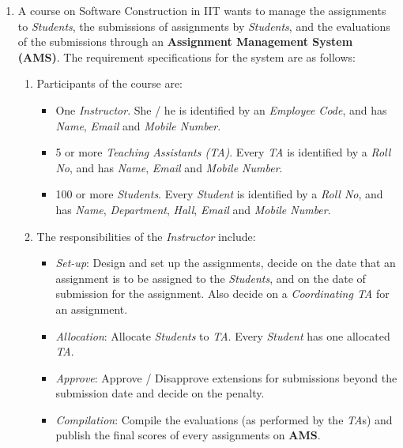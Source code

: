 \documentclass{article}
\begin{document}
\begin{tabular}{l}
\hspace{16cm} \\ \hline 
\end{tabular}
\begin{enumerate}


\item A course on \textsf{Software Construction} in IIT wants to manage the assignments to {\em Students}, the submissions of assignments by {\em Students}, and the evaluations of the submissions through an {\bf Assignment Management System (AMS)}. The requirement specifications for the system are as follows:

\begin{enumerate}
\item Participants of the course are: 

\begin{itemize}

\item One {\em Instructor}. She / he is identified by an {\em Employee Code}, and has {\em Name}, {\em Email} and {\em Mobile Number}.
\item 5 or more {\em Teaching Assistants (TA)}. Every {\em TA} is identified by a {\em Roll No}, and has {\em Name}, {\em Email} and {\em Mobile Number}.
\item 100 or more {\em Students}. Every {\em Student} is identified by a {\em Roll No}, and has {\em Name}, {\em Department}, {\em Hall}, {\em Email} and {\em Mobile Number}. 

\end{itemize}

\item The responsibilities of the {\em Instructor} include:

\begin{itemize}
\item {\em Set-up}: Design and set up the assignments, decide on the date that an assignment is to be assigned to the {\em Students}, and on the date of submission for the assignment. Also decide on a {\em Coordinating TA} for an assignment.
\item {\em Allocation}: Allocate {\em Students} to {\em TA}. Every {\em Student} has one allocated {\em TA}.
\item {\em Approve}: Approve / Disapprove extensions for submissions beyond the submission date and decide on the penalty.
\item {\em Compilation}: Compile the evaluations (as performed by the {\em TA}s) and publish the final scores of every assignments on {\bf AMS}. 
\end{itemize}


\end{enumerate}
\end{enumerate}
\end{document}
